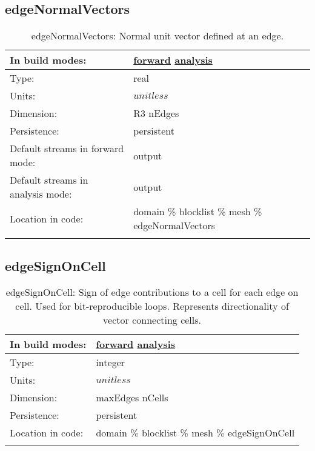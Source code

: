 \subsection[edgeNormalVectors]{edgeNormalVectors}
\label{subsec:var_sec_mesh_edgeNormalVectors}
\begin{center}
\begin{longtable}{| p{2.0in} | p{4.0in} |}
        \hline 
        In build modes: & \hyperref[subsec:forward_var_tab_mesh]{forward} \hyperref[subsec:analysis_var_tab_mesh]{analysis} \\
        \hline 
        Type: & real \\
        \hline 
        Units: & $unitless$ \\
        \hline 
        Dimension: & R3 nEdges \\
        \hline 
        Persistence: & persistent \\
        \hline 
		 Default streams in forward mode: &  output \\
        \hline 
		 Default streams in analysis mode: &  output \\
        \hline 
		 Location in code: & domain \% blocklist \% mesh \% edgeNormalVectors \\
		 \hline 
    \caption{edgeNormalVectors: Normal unit vector defined at an edge.}
\end{longtable}
\end{center}
\subsection[edgeSignOnCell]{edgeSignOnCell}
\label{subsec:var_sec_mesh_edgeSignOnCell}
\begin{center}
\begin{longtable}{| p{2.0in} | p{4.0in} |}
        \hline 
        In build modes: & \hyperref[subsec:forward_var_tab_mesh]{forward} \hyperref[subsec:analysis_var_tab_mesh]{analysis} \\
        \hline 
        Type: & integer \\
        \hline 
        Units: & $unitless$ \\
        \hline 
        Dimension: & maxEdges nCells \\
        \hline 
        Persistence: & persistent \\
        \hline 
		 Location in code: & domain \% blocklist \% mesh \% edgeSignOnCell \\
		 \hline 
    \caption{edgeSignOnCell: Sign of edge contributions to a cell for each edge on cell. Used for bit-reproducible loops. Represents directionality of vector connecting cells.}
\end{longtable}
\end{center}
